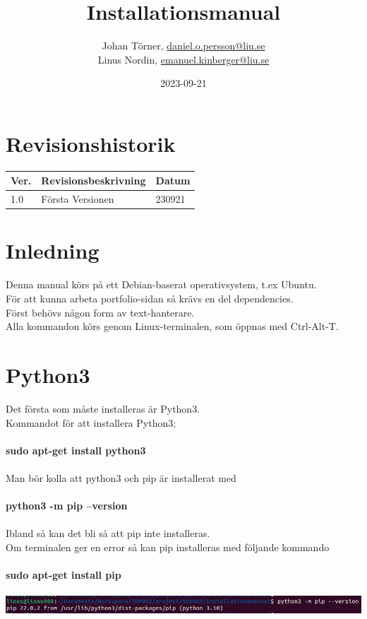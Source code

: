 \documentclass{TDP003mall}
\author{Johan Törner, \url{daniel.o.persson@liu.se}\\
  Linus Nordin, \url{emanuel.kinberger@liu.se}\\}
\title{Installationsmanual}
\date{2023-09-21}
\begin{document}
\graphicspath{ {./images/} }

\projectpage
\section{Revisionshistorik}
\begin{table}[!h]
\begin{tabularx}{\linewidth}{|l|X|l|}
\hline
Ver. & Revisionsbeskrivning & Datum \\\hline
1.0 & Första Versionen & 230921 \\\hline
\end{tabularx}
\end{table}


\section{Inledning}

Denna manual körs på ett Debian-baserat operativsystem, t.ex Ubuntu.\\
För att kunna arbeta portfolio-sidan så krävs en del dependencies.\\
Först behövs någon form av text-hanterare.\\

Alla kommandon körs genom Linux-terminalen, som öppnas med Ctrl-Alt-T.\\



\section{Python3}
Det första som måste installeras är Python3.\\ 
Kommandot för att installera Python3;\\\\
\textbf{sudo apt-get install python3}\\\\
Man bör kolla att python3 och pip är installerat med\\\\
\textbf{python3 -m pip --version}\\\\
Ibland så kan det bli så att pip inte installeras.\\
Om terminalen ger en error så kan pip installeras med följande kommando\\\\
\textbf{sudo apt-get install pip}\\\\
\includegraphics[scale=0.5]{pip_version}
\end{document}
